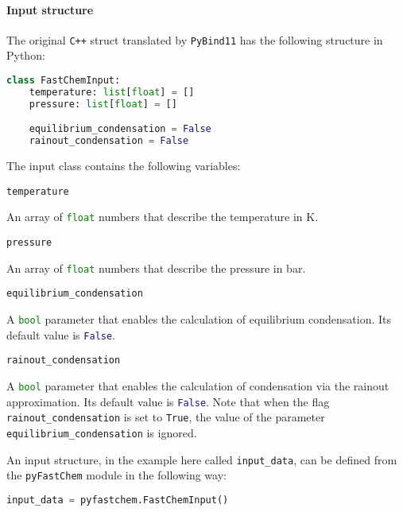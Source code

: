 \documentclass[numbers=noenddot]{aux/fcmanual}
\newcommand{\pfc}{\texttt{pyFastChem}\xspace}
\newcommand{\cpp}{\ttt{C++}\xspace}
\newcommand{\pb}{\texttt{PyBind11}\xspace}
\newcommand{\ttt}[1]{\texttt {#1}}
\begin{document}
\paragraph{Input structure}

The original \cpp struct translated by \pb has the following structure in Python:
\bigbreak
\begin{lstlisting}[language=Python]
  class FastChemInput:
    temperature: list[float] = []
    pressure: list[float] = []

    equilibrium_condensation = False
    rainout_condensation = False
\end{lstlisting}
\bigbreak

The input class contains the following variables:

\bigbreak

\lstinline[language=Python]!temperature!
\begin{addmargin}[25pt]{0pt}
	An array of \lstinline[language=Python]!float! numbers that describe the temperature in K.
\end{addmargin}

\bigbreak

\lstinline[language=Python]!pressure!
\begin{addmargin}[25pt]{0pt}
	An array of \lstinline[language=Python]!float! numbers that describe the pressure in bar.
\end{addmargin}

\bigbreak

\lstinline[language=Python]!equilibrium_condensation!
\begin{addmargin}[25pt]{0pt}
	A \lstinline[language=Python]!bool! parameter that enables the calculation of equilibrium condensation. Its default value is  \lstinline[language=Python]!False!.
\end{addmargin}

\bigbreak

\lstinline[language=Python]!rainout_condensation!
\begin{addmargin}[25pt]{0pt}
	A \lstinline[language=Python]!bool! parameter that enables the calculation of condensation via the rainout approximation. Its default value is \lstinline[language=Python]!False!. Note that when the flag \lstinline!rainout_condensation! is set to \lstinline!True!, the value of the parameter \lstinline!equilibrium_condensation! is ignored.
\end{addmargin}

\bigbreak

An input structure, in the example here called \lstinline!input_data!, can be defined from the \pfc module in the following way:
\begin{lstlisting}[language=Python]
	input_data = pyfastchem.FastChemInput()
\end{lstlisting}
\end{document}
